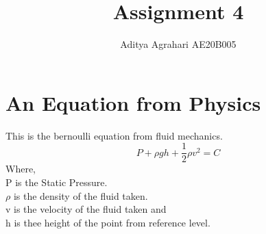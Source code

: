 \documentclass[a4paper, 12pt]{article}
\begin{document}
\title{Assignment 4}
\author{Aditya Agrahari AE20B005}
\maketitle
\section{An Equation from Physics}
This is the bernoulli equation from fluid mechanics.
\begin{equation}
    P + \rho gh +\frac{1}{2}\rho v^2 = C
\end{equation}
Where,\\
P is the Static Pressure.\\
$\rho$ is the density of the fluid taken.\\
v is the velocity of the fluid taken and\\
h is thee height of the point from reference level.
\end{document}
